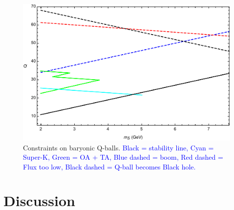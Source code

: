 \documentclass[twocolumn,showpacs,preprintnumbers,amsmath,amssymb,prd]{revtex4}
\begin{document}
\begin{figure}
\includegraphics[scale=.45]{Qballconstraint.pdf}
\caption{Constraints on baryonic Q-balls.
\textcolor{blue}{Black = stability line, Cyan = Super-K, Green = OA + TA, Blue dashed = boom, Red dashed = Flux too low, Black dashed = Q-ball becomes Black hole.}}
\label{fig:Qballconstraint}
\end{figure}

\section{Discussion}
\label{sec:discussion}
\end{document}
